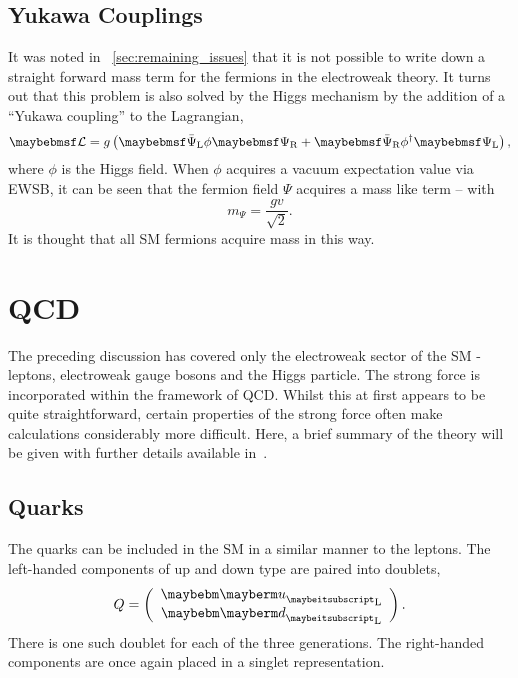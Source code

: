 \subsection{Yukawa Couplings}
\label{sec:theory_yukawa}
It was noted in \sec~\ref{sec:remaining_issues} that it is not possible to write
down a straight forward mass term for the fermions in the electroweak theory. It
turns out that this problem is also solved by the Higgs mechanism by the
addition of a ``Yukawa coupling'' to the Lagrangian,
\begin{equation*}
\lagrangiand = g \left(\APsiL \phi \PsiR + \APsiR\phi^{\dagger}\PsiL\right),
\end{equation*}
where $\phi$ is the Higgs field. When $\phi$ acquires a vacuum expectation value
via \ac{EWSB}, it can be seen that the fermion field $\Psi$ acquires a mass like
term -- with
\begin{equation*}
m_{\Psi} = \frac{gv}{\sqrt{2}}.
\end{equation*}
It is thought that all \ac{SM} fermions acquire mass in this way.

\section{\acl{QCD}}
\label{sec:sm_qcd}
The preceding discussion has covered only the electroweak sector of the \ac{SM}
- leptons, electroweak gauge bosons and the Higgs particle. The strong force is
incorporated within the framework of \ac{QCD}.  Whilst this at first appears to
be quite straightforward, certain properties of the strong force often make
calculations considerably more difficult. Here, a brief summary of the theory
will be given with further details available in~\cite{pink_book}.

\subsection{Quarks}
The quarks can be included in the \ac{SM} in a similar manner to the
leptons. The left-handed components of up and down type are paired into doublets,
\begin{equation*}
Q=\left(\begin{array}{c}\Pup_{\textrm{L}} \\ \Pdown_{\textrm{L}}\end{array}\right).
\end{equation*}
There is one such doublet for each of the three generations. The right-handed
components are once again placed in a singlet representation.

